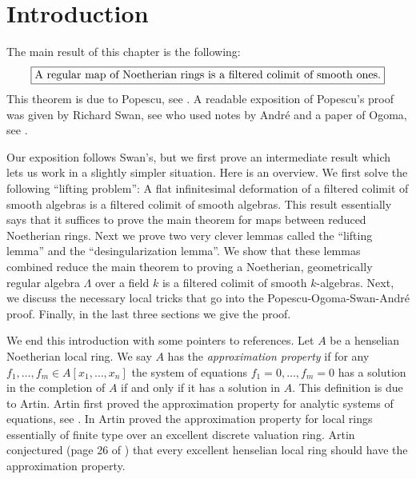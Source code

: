 \section{Introduction}
\label{smoothing-section-introduction}
The main result of this chapter is the following:
$$
\fbox{A regular map of Noetherian rings is a filtered colimit
of smooth ones.}
$$
This theorem is due to Popescu, see \cite{popescu-letter}.
A readable exposition of Popescu's proof was given by Richard Swan,
see \cite{swan} who used notes by Andr\'e and a paper of Ogoma, see
\cite{Ogoma}.

\medskip\noindent
Our exposition follows Swan's, but we first prove an intermediate result
which lets us work in a slightly simpler situation. Here is an overview.
We first solve the following ``lifting problem'': A flat infinitesimal
deformation of a filtered colimit of smooth algebras is a filtered colimit
of smooth algebras. This result essentially says that it suffices to prove
the main theorem for maps between reduced Noetherian rings. Next we prove
two very clever lemmas called the ``lifting lemma'' and the
``desingularization lemma''. We show that these lemmas combined
reduce the main theorem to proving a Noetherian, geometrically regular
algebra $\Lambda$ over a field $k$ is a filtered colimit of smooth $k$-algebras.
Next, we discuss the necessary local tricks that go into the
Popescu-Ogoma-Swan-Andr\'e proof. Finally, in the last three sections
we give the proof.

\medskip\noindent
We end this introduction with some pointers to references.
Let $A$ be a henselian Noetherian local ring.
We say $A$ has the {\it approximation property} if for any
$f_1, \ldots, f_m \in A[x_1, \ldots, x_n]$ the system of equations
$f_1 = 0, \ldots, f_m = 0$ has a solution in the completion
of $A$ if and only if it has a solution in $A$. This definition
is due to Artin.
Artin first proved the approximation property for analytic systems of
equations, see \cite{Artin-Analytic-Approximation}.
In \cite{Artin-Algebraic-Approximation} Artin proved the
approximation property for local rings
essentially of finite type over an excellent discrete valuation ring.
Artin conjectured (page 26 of \cite{Artin-Algebraic-Approximation})
that every excellent henselian local ring should have the
approximation property.

